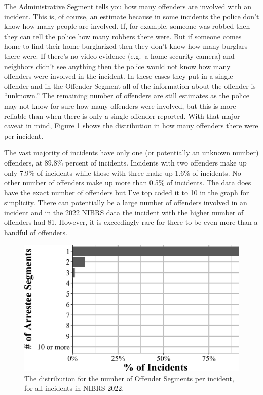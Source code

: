 \documentclass[
  12pt,
  openany]{book}
\begin{document}
The Administrative Segment tells you how many offenders are involved with an incident. This is, of course, an estimate because in some incidents the police don't know how many people are involved. If, for example, someone was robbed then they can tell the police how many robbers there were. But if someone comes home to find their home burglarized then they don't know how many burglars there were. If there's no video evidence (e.g.~a home security camera) and neighbors didn't see anything then the police would not know how many offenders were involved in the incident. In these cases they put in a single offender and in the Offender Segment all of the information about the offender is ``unknown.'' The remaining number of offenders are still estimates as the police may not know for sure how many offenders were involved, but this is more reliable than when there is only a single offender reported. With that major caveat in mind, Figure \ref{fig:administrativeOffenderSegments} shows the distribution in how many offenders there were per incident.

The vast majority of incidents have only one (or potentially an unknown number) offenders, at 89.8\% percent of incidents. Incidents with two offenders make up only 7.9\% of incidents while those with three make up 1.6\% of incidents. No other number of offenders make up more than 0.5\% of incidents. The data does have the exact number of offenders but I've top coded it to 10 in the graph for simplicity. There can potentially be a large number of offenders involved in an incident and in the 2022 NIBRS data the incident with the higher number of offenders had 81. However, it is exceedingly rare for there to be even more than a handful of offenders.

\begin{figure}

{\centering \includegraphics[width=0.9\linewidth]{12_nibrs_administrative_files/figure-latex/administrativeOffenderSegments-1} 

}

\caption{The distribution for the number of Offender Segments per incident, for all incidents in NIBRS 2022.}\label{fig:administrativeOffenderSegments}
\end{figure}
\end{document}
